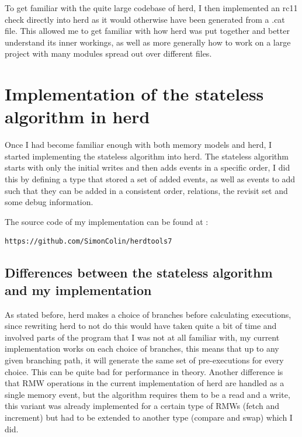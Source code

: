 \documentclass[a4,11pt]{article}
\begin{document}
To get familiar with the quite large codebase of herd, I then implemented an rc11 check directly into herd as it would otherwise have been generated from a .cat file. This allowed me to get familiar with how herd was put together and better understand its inner workings, as well as more generally how to work on a large project with many modules spread out over different files.

\section{Implementation of the stateless algorithm in herd}

Once I had become familiar enough with both memory models and herd, I started implementing the stateless algorithm into herd. The stateless algorithm starts with only the initial writes and then adds events in a specific order, I did this by defining a type that stored a set of added events, as well as events to add such that they can be added in a consistent order, relations, the revisit set and some debug information.

The source code of my implementation can be found at :
\begin{lstlisting}
https://github.com/SimonColin/herdtools7
\end{lstlisting}

\subsection{Differences between the stateless algorithm and my implementation}

As stated before, herd makes a choice of branches before calculating executions, since rewriting herd to not do this would have taken quite a bit of time and involved parts of the program that I was not at all familiar with, my current implementation works on each choice of branches, this means that up to any given branching path, it will generate the same set of pre-executions for every choice. This can be quite bad for performance in theory. Another difference is that RMW operations in the current implementation of herd are handled as a single memory event, but the algorithm requires them to be a read and a write, this variant was already implemented for a certain type of RMWs (fetch and increment) but had to be extended to another type (compare and swap) which I did.

\end{document}
